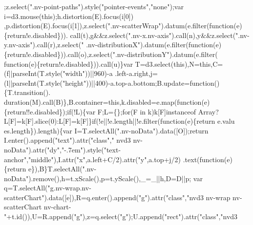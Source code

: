 \begin{DoxyCode}
      ;z.select(\textcolor{stringliteral}{".nv-point-paths"}).style(\textcolor{stringliteral}{"pointer-events"},\textcolor{stringliteral}{"none"});var i=d3.mouse(\textcolor{keyword}{this});h.distortion(E).focus(i[0])
      ,p.distortion(E).focus(i[1]),z.select(\textcolor{stringliteral}{".nv-scatterWrap"}).datum(e.filter(\textcolor{keyword}{function}(e)\{return!e.disabled\})).
      call(t),g&&z.select(\textcolor{stringliteral}{".nv-x.nv-axis"}).call(n),y&&z.select(\textcolor{stringliteral}{".nv-y.nv-axis"}).call(r),z.select(\textcolor{stringliteral}{"
      .nv-distributionX"}).datum(e.filter(\textcolor{keyword}{function}(e)\{return!e.disabled\})).call(o),z.select(\textcolor{stringliteral}{".nv-distributionY"}).datum(e.filter(\textcolor{keyword}{
      function}(e)\{return!e.disabled\})).call(u)\}var T=d3.select(\textcolor{keyword}{this}),N=\textcolor{keyword}{this},C=(f||parseInt(T.style(\textcolor{stringliteral}{"width"}))||960)-a
      .left-a.right,j=(l||parseInt(T.style(\textcolor{stringliteral}{"height"}))||400)-a.top-a.bottom;B.update=\textcolor{keyword}{function}()\{T.transition().
      duration(M).call(B)\},B.container=\textcolor{keyword}{this},k.disabled=e.map(\textcolor{keyword}{function}(e)\{\textcolor{keywordflow}{return}!!e.disabled\});\textcolor{keywordflow}{if}(!L)\{var F;L=\{\};\textcolor{keywordflow}{for}(F 
      in k)k[F]instanceof Array?L[F]=k[F].slice(0):L[F]=k[F]\}\textcolor{keywordflow}{if}(!e||!e.length||!e.filter(\textcolor{keyword}{function}(e)\{return e.valu
      es.length\}).length)\{var I=T.selectAll(\textcolor{stringliteral}{".nv-noData"}).data([O]);\textcolor{keywordflow}{return} I.enter().append(\textcolor{stringliteral}{"text"}).attr(\textcolor{stringliteral}{"class"},\textcolor{stringliteral}{"
      nvd3 nv-noData"}).attr(\textcolor{stringliteral}{"dy"},\textcolor{stringliteral}{"-.7em"}).style(\textcolor{stringliteral}{"text-anchor"},\textcolor{stringliteral}{"middle"}),I.attr(\textcolor{stringliteral}{"x"},a.left+C/2).attr(\textcolor{stringliteral}{"y"},a.top+j/2)
      .text(\textcolor{keyword}{function}(e)\{\textcolor{keywordflow}{return} e\}),B\}T.selectAll(\textcolor{stringliteral}{".nv-noData"}).remove(),h=t.xScale(),p=t.yScale(),\_=\_||h,D=D||p;
      var q=T.selectAll(\textcolor{stringliteral}{"g.nv-wrap.nv-scatterChart"}).data([e]),R=q.enter().append(\textcolor{stringliteral}{"g"}).attr(\textcolor{stringliteral}{"class"},\textcolor{stringliteral}{"nvd3 nv-wrap
       nv-scatterChart nv-chart-"}+t.id()),U=R.append(\textcolor{stringliteral}{"g"}),z=q.select(\textcolor{stringliteral}{"g"});U.append(\textcolor{stringliteral}{"rect"}).attr(\textcolor{stringliteral}{"class"},\textcolor{stringliteral}{"nvd3
}
\end{DoxyCode}
